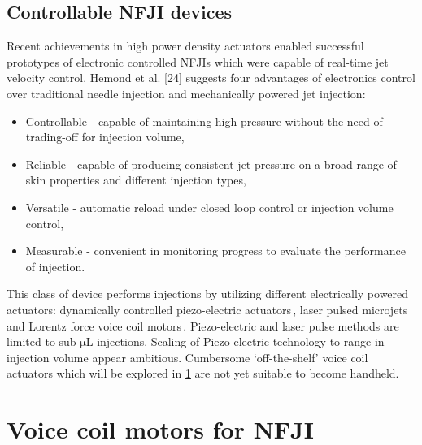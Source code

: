     \subsection{Controllable \acs{NFJI} devices}    \label{Chapter:background/needle-free jet injection/Controllable NFJI}
    
        Recent achievements in high power density actuators enabled successful prototypes of electronic controlled \acsp{NFJI} which were capable of real-time jet velocity control. Hemond et al. [24] suggests four advantages of electronics control over traditional needle injection and mechanically powered jet injection:
        
        \begin{itemize}
            \item Controllable - capable of maintaining high pressure without the need of trading-off for injection volume,
            \item Reliable - capable of producing consistent jet pressure on a broad range of skin properties and different injection types,
            \item Versatile - automatic reload under closed loop control or injection volume control,
            \item Measurable - convenient in monitoring progress to evaluate the performance of injection.
        \end{itemize}
        
        This class of device performs injections by utilizing different electrically powered actuators: dynamically controlled piezo-electric actuators\,\cite{Stachowiak2009}, laser pulsed microjets\,\cite{tawaga2013, park2012} and Lorentz force voice coil motors\,\cite{taberner2006,hemond2006}. Piezo-electric and laser pulse methods are limited to sub $\mathrm{\mu L}$ injections. Scaling of Piezo-electric technology to   range in injection volume appear ambitious. Cumbersome ‘off-the-shelf’ voice coil actuators which will be explored in \ref{Chapter:background/voice coil motors for NFJI} are not yet suitable to become handheld.

\section{Voice coil motors for \acs{NFJI}}          \label{Chapter:background/voice coil motors for NFJI}
    
